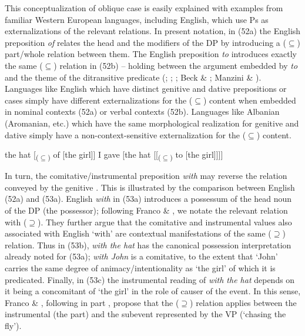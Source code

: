 \documentclass[output=paper]{langsci/langscibook}
\begin{document}
This conceptualization of oblique case is easily explained with examples from familiar Western European languages, including English, which use Ps as externalizations of the relevant relations. In present notation, in (52a) the English preposition \textit{of} relates the head and the modifiers of the DP by introducing a ($\subseteq$) part/whole relation between them. The English preposition \textit{to} introduces exactly the same ($\subseteq$) relation in (52b) – holding between the argument embedded by \textit{to} and the theme of the ditransitive predicate (\citealt{Kayne1984}; \citealt{Pesetsky1995}; \citealt{Harley2002}; Beck \& \citealt{Johnson2002}; Manzini \& \citealt{Franco2016}).  Languages like English which have distinct genitive and dative prepositions or cases simply have different externalizations for the ($\subseteq$) content when embedded in nominal contexts (52a) or verbal contexts (52b). Languages like Albanian (Aromanian, etc.) which have the same morphological realization for genitive and dative simply have a non-context-sensitive externalization for the ($\subseteq$) content.

\ea%
    \label{ex:manzini:52}
    \ea  the hat [\textsubscript{($\subseteq$)} of [the girl]]
    \ex  I gave [the hat [[\textsubscript{($\subseteq$)} to [the girl]]]]
    \z    
\z


In turn, the comitative/instrumental preposition \textit{with} may reverse the relation conveyed by the genitive \citep{Levinson2011}. This is illustrated by the comparison between English (52a) and (53a). English \textit{with} in (53a) introduces a possessum of the head noun of the DP (the possessor); following Franco \& \citet{Manzini2017}, we notate the relevant relation with ($\supseteq$). They further argue that the comitative and instrumental values also associated with English ‘with’ are contextual manifestations of the same ($\supseteq$) relation. Thus in (53b), \textit{with the hat} has the canonical possession interpretation already noted for (53a); \textit{with John} is a comitative, to the extent that ‘John’ carries the same degree of animacy/intentionality as ‘the girl’ of which it is predicated. Finally, in (53c) the instrumental reading of \textit{with the hat} depends on it being a concomitant of ‘the girl’ in the role of causer of the event. In this sense, Franco \& \citet{Manzini2017}, following in part \citet{Bruening2012}, propose that the ($\supseteq$) relation applies between the instrumental (the part) and the subevent represented by the VP (‘chasing the fly’).
\end{document}
